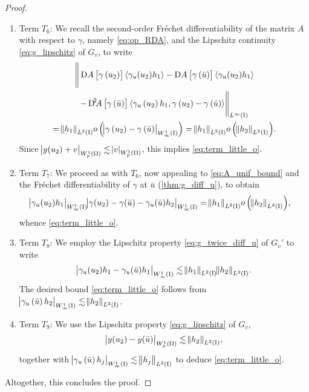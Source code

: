 \documentclass[final]{siamltex}
\begin{document}
\begin{proof}
\begin{enumerate}[$\bullet$]
	\item Term $T_6$: We recall the second-order Fr\'echet differentiability of the matrix $A$ with respect to $\gamma$, namely \eqref{eq:op_RDA}, and the Lipschitz continuity \eqref{eq:g_lipschitz} of $G_v$, to write
	 	\begin{multline*}
	 		\Bigg\lVert 
				\Dif A\sbr{\gamma\del{u_2}}{\langle {\gamma_u(u_2)h_1} \rangle} - \Dif A\sbr{\gamma\del{\bar{u}}}{\langle {\gamma_u(u_2)h_1} \rangle} \\
					- \Dif^2 \!\! A\sbr{\gamma\del{\bar{u}}}{\langle {\gamma_u\del{u_2}h_1, \gamma\del{u_2}-\gamma\del{\bar{u}}} \rangle}
			\Bigg\rVert_{{L^\infty\del{{\text{\rm I}}}}} \\
			 = {\norm{{h_1}}_{{L^2\del{{{\text{\rm I}}}}}}}{\mathop{o}\del{{{{\abs{{\gamma\del{u_2} - \gamma\del{\bar{u}}}}_{{W^{{1}}_{{\infty}}\del{{\text{\rm I}}}}}}}}}}
				   = {\norm{{h_1}}_{{L^2\del{{{\text{\rm I}}}}}}} {\mathop{o}\del{{{{\norm{{h_2}}_{{L^2\del{{{\text{\rm I}}}}}}}}}}}.
		\end{multline*} 
	Since ${\abs{{y(u_2)+ v}}_{{W^{{1}}_{{p}}\del{{\Omega}}}}} \lesssim {\abs{{v}}_{{W^{{1}}_{{p}}\del{{\Omega}}}}}$, this implies \eqref{eq:term_little_o}.

	\item Term $T_7$: We proceed as with $T_6$, now appealing to \eqref{eq:A_unif_bound} and the Fr\'echet differentiability of $\gamma$ at ${\bar{u}}$ (\autoref{thm:g_diff_u}), to obtain
		\begin{align*}
		{\abs{{\gamma_u(u_2)h_1}}_{{W^{{1}}_{{\infty}}\del{{\text{\rm I}}}}}} 
			{\abs{{\gamma(u_2) - \gamma({\bar{u}}) - \gamma_u({\bar{u}})h_2}}_{{W^{{1}}_{{\infty}}\del{{\text{\rm I}}}}}}
				&= {\norm{{h_1}}_{{L^2\del{{{\text{\rm I}}}}}}} {\mathop{o}\del{{{{\norm{{h_2}}_{{L^2\del{{{\text{\rm I}}}}}}}}}}},
		\end{align*}
	whence \eqref{eq:term_little_o}.
	
	\item Term $T_8$: We employ the Lipschitz property \eqref{eq:g_twice_diff_u} of $G_v'$ to write 
		\[
			{\abs{{\gamma_u(u_2)h_1 - \gamma_u({\bar{u}})h_1}}_{{W^{{1}}_{{\infty}}\del{{\text{\rm I}}}}}}				\lesssim {\norm{{h_1}}_{{L^2\del{{{\text{\rm I}}}}}}} {\norm{{h_2}}_{{L^2\del{{{\text{\rm I}}}}}}}.
		\]
	The desired bound \eqref{eq:term_little_o} follows from 
	${\abs{{\gamma_u\del{\bar{u}} h_2}}_{{W^{{1}}_{{\infty}}\del{{\text{\rm I}}}}}} \lesssim {\norm{{h_2}}_{{L^2\del{{{\text{\rm I}}}}}}}$.
	
	\item Term $T_9$: We use the Lipschitz property \eqref{eq:g_lipschitz} of $G_v$,
		\[
			{\abs{{y(u_2)-y({\bar{u}})}}_{{W^{{1}}_{{p}}\del{{\Omega}}}}} \lesssim {\norm{{h_2}}_{{L^2\del{{{\text{\rm I}}}}}}},
		\]
	 together with ${\abs{{\gamma_u\del{\bar{u}} h_j}}_{{W^{{1}}_{{\infty}}\del{{\text{\rm I}}}}}} \lesssim {\norm{{h_j}}_{{L^2\del{{{\text{\rm I}}}}}}}$ to deduce \eqref{eq:term_little_o}.
\end{enumerate}
Altogether, this concludes the proof.
\end{proof}
\end{document}
